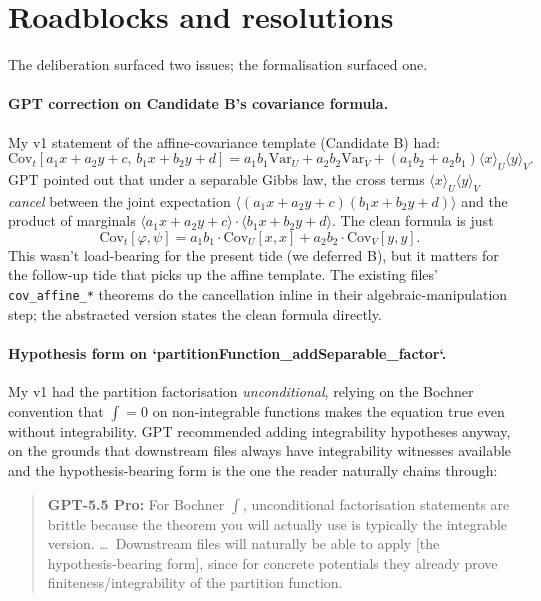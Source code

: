 \documentclass[11pt]{article}
\newcommand{\gptbox}[1]{\par\medskip\begin{quote}\small\textbf{\textcolor{green!50!black}{GPT-5.5 Pro:}} #1\end{quote}\medskip}
\begin{document}
\section{Roadblocks and resolutions}

The deliberation surfaced two issues; the formalisation surfaced one.

\paragraph{GPT correction on Candidate B's covariance formula.}
My v1 statement of the affine-covariance template (Candidate B) had:
\[
  \mathrm{Cov}_t[a_1 x + a_2 y + c,\, b_1 x + b_2 y + d]
  = a_1 b_1 \mathrm{Var}_U + a_2 b_2 \mathrm{Var}_V
  + (a_1 b_2 + a_2 b_1) \langle x \rangle_U \langle y \rangle_V.
\]
GPT pointed out that under a separable Gibbs law, the cross terms
$\langle x \rangle_U \langle y \rangle_V$ \emph{cancel} between the
joint expectation $\langle (a_1 x + a_2 y + c)(b_1 x + b_2 y + d)
\rangle$ and the product of marginals $\langle a_1 x + a_2 y + c
\rangle \cdot \langle b_1 x + b_2 y + d \rangle$. The clean formula is
just
\[
  \mathrm{Cov}_t[\varphi, \psi]
  = a_1 b_1 \cdot \mathrm{Cov}_U[x, x] + a_2 b_2 \cdot \mathrm{Cov}_V[y, y].
\]
This wasn't load-bearing for the present tide (we deferred B), but it
matters for the follow-up tide that picks up the affine template. The
existing files' \texttt{cov\_affine\_*} theorems do the cancellation
inline in their algebraic-manipulation step; the abstracted version
states the clean formula directly.

\paragraph{Hypothesis form on `partitionFunction_addSeparable_factor`.}
My v1 had the partition factorisation \emph{unconditional}, relying on
the Bochner convention that $\int = 0$ on non-integrable functions
makes the equation true even without integrability. GPT recommended
adding integrability hypotheses anyway, on the grounds that downstream
files always have integrability witnesses available and the
hypothesis-bearing form is the one the reader naturally chains
through:

\gptbox{For Bochner $\int$, unconditional factorisation statements
are brittle because the theorem you will actually use is typically
the integrable version. \ldots~Downstream files will naturally be
able to apply [the hypothesis-bearing form], since for concrete
potentials they already prove finiteness/integrability of the
partition function.}
\end{document}
